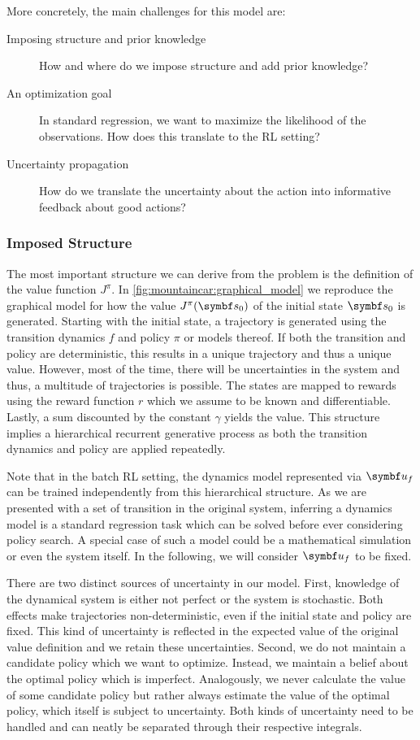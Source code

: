 More concretely, the main challenges for this model are:
\begin{description}
    \item[Imposing structure and prior knowledge] How and where do we impose structure and add prior knowledge?
    \item[An optimization goal] In standard regression, we want to maximize the likelihood of the observations. How does this translate to the RL setting?
    \item[Uncertainty propagation] How do we translate the uncertainty about the action into informative feedback about good actions?
\end{description}


\subsubsection{Imposed Structure}
The most important structure we can derive from the problem is the definition of the value function $J^\pi$.
In \cref{fig:mountaincar:graphical_model} we reproduce the graphical model for how the value $J^\pi(\mat{s}_0)$ of the initial state $\mat{s}_0$ is generated.
Starting with the initial state, a trajectory is generated using the transition dynamics $f$ and policy $\pi$ or models thereof.
If both the transition and policy are deterministic, this results in a unique trajectory and thus a unique value.
However, most of the time, there will be uncertainties in the system and thus, a multitude of trajectories is possible.
The states are mapped to rewards using the reward function $r$ which we assume to be known and differentiable.
Lastly, a sum discounted by the constant $\gamma$ yields the value.
This structure implies a hierarchical recurrent generative process as both the transition dynamics and policy are applied repeatedly.

Note that in the batch RL setting, the dynamics model represented via $\mat{u}_f$ can be trained independently from this hierarchical structure.
As we are presented with a set of transition in the original system, inferring a dynamics model is a standard regression task which can be solved before ever considering policy search.
A special case of such a model could be a mathematical simulation or even the system itself.
In the following, we will consider $\mat{u}_f$ to be fixed.

There are two distinct sources of uncertainty in our model.
First, knowledge of the dynamical system is either not perfect or the system is stochastic.
Both effects make trajectories non-deterministic, even if the initial state and policy are fixed.
This kind of uncertainty is reflected in the expected value of the original value definition and we retain these uncertainties.
Second, we do not maintain a candidate policy which we want to optimize.
Instead, we maintain a belief about the optimal policy which is imperfect.
Analogously, we never calculate the value of some candidate policy but rather always estimate the value of the optimal policy, which itself is subject to uncertainty.
Both kinds of uncertainty need to be handled and can neatly be separated through their respective integrals.


